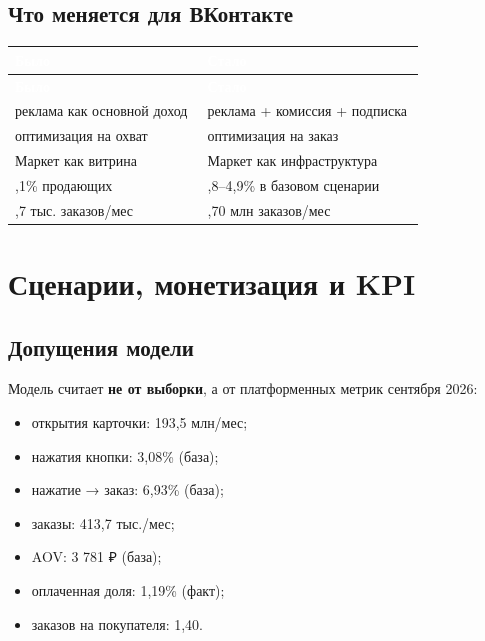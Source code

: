 \documentclass[10pt,a4paper]{article}
\begin{document}
\subsection{Что меняется для ВКонтакте}

\begingroup
\small
\setlength{\tabcolsep}{3pt}
\renewcommand{\arraystretch}{1.12}
\begin{longtable}{@{}>{\raggedright\arraybackslash}p{0.4669\linewidth}>{\raggedright\arraybackslash}p{0.5208\linewidth}@{}}
\rowcolor{blue}
\textcolor{white}{\textbf{Было}} & \textcolor{white}{\textbf{Стало}} \\
\endfirsthead
\rowcolor{blue}
\textcolor{white}{\textbf{Было}} & \textcolor{white}{\textbf{Стало}} \\
\endhead
\hline
реклама как основной доход & реклама + комиссия + подписка \\
оптимизация на охват & оптимизация на заказ \\
Маркет как витрина & Маркет как инфраструктура \\
3,1\% продающих & 3,8–4,9\% в базовом сценарии \\
413,7 тыс. заказов/мес & 1,70 млн заказов/мес \\
\hline
\end{longtable}
\endgroup
\vspace{4pt}

\clearpage

\section{Сценарии, монетизация и KPI}

\subsection{Допущения модели}

Модель считает \textbf{не от выборки}, а от платформенных метрик сентября 2026:\par

\begin{itemize}[leftmargin=1.35em,itemsep=2pt,topsep=3pt,parsep=0pt]
\item открытия карточки: 193,5 млн/мес;
\item нажатия кнопки: 3,08\% (база);
\item нажатие → заказ: 6,93\% (база);
\item заказы: 413,7 тыс./мес;
\item AOV: 3 781 ₽ (база);
\item оплаченная доля: 1,19\% (факт);
\item заказов на покупателя: 1,40.
\end{itemize}
\end{document}
